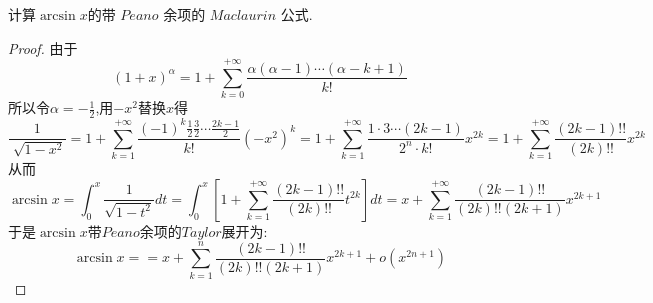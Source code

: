 \documentclass[lang=cn,newtx,10pt,scheme=chinese]{elegantbook}
\begin{document}
\begin{exercise}
   计算\(\arcsin x\)的带 $Peano$ 余项的 $Maclaurin$ 公式.
    \begin{proof}
    由于
    \begin{equation}
    (1+x)^\alpha =1+\sum_{k=0}^{+\infty}\frac{\alpha(\alpha-1)\cdots(\alpha-k+1)}{k!}
        \nonumber
    \end{equation}
    所以令$\alpha=-\frac{1}{2}$,用$-x^2$替换$x$得
    \begin{equation}
    \frac{1}{\sqrt[]{1-x^2} } =1+\sum_{k=1}^{+\infty}\frac{(-1)^k\frac{1}{2}\frac{3}{2}\cdots\frac{2k-1}{2}}{k!}(-x^2)^{k}
    =1+\sum_{k=1}^{+\infty}\frac{1\cdot3\cdots(2k-1)}{2^n\cdot k!}x^{2k}
    =1+\sum_{k=1}^{+\infty}\frac{(2k-1)!!}{(2k)!!}x^{2k}
        \nonumber
    \end{equation}
    从而
    \begin{equation}
    \arcsin x=\int_{0}^{x} \frac{1}{\sqrt{1-t^2}}dt=\int_{0}^{x} [1+\sum_{k=1}^{+\infty}\frac{(2k-1)!!}{(2k)!!}t^{2k}]dt
    =x+\sum_{k=1}^{+\infty}\frac{(2k-1)!!}{(2k)!!(2k+1)}x^{2k+1}
        \nonumber
    \end{equation}
    于是$\arcsin x$带$Peano$余项的$Taylor$展开为:
    \begin{equation}
    \arcsin x==x+\sum_{k=1}^{n}\frac{(2k-1)!!}{(2k)!!(2k+1)}x^{2k+1}+o(x^{2n+1})
        \nonumber
    \end{equation}
    \end{proof}
\end{exercise}
\end{document}
